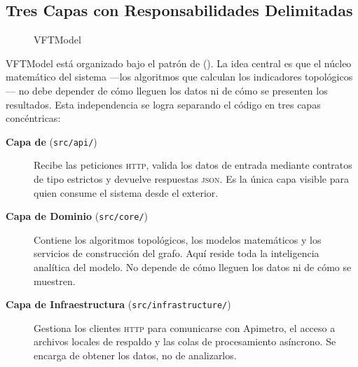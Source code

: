 \subsection{Tres Capas con Responsabilidades Delimitadas}
\label{subsec:vft-capas}

\begin{figure}[htbp]
    \centering
    \DIFdelbeginFL %
\DIFdelendFL \DIFaddbeginFL {}
    \caption[Arquitectura \textit{Ports and Adapters} de VFTModel]{ \DIFaddendFL VFTModel\DIFaddbeginFL {}\texttt{}\DIFaddendFL }
    \label{fig:VFTModel-arquitectura}
    \DIFdelbeginFL %
\DIFdelendFL \DIFaddbeginFL {}
\DIFaddendFL \end{figure}

VFTModel está organizado bajo el patrón de 
(). La idea central es que el núcleo matemático del
sistema —los algoritmos que calculan los indicadores topológicos— no debe depender
de cómo lleguen los datos ni de cómo se presenten los resultados. Esta
independencia se logra separando el código en tres capas concéntricas:

\begin{description}
    \item[\textbf{Capa de \api{}} (\texttt{src/api/})]
    Recibe las peticiones \textsc{http}, valida los datos de entrada mediante
    contratos de tipo estrictos y devuelve respuestas \textsc{json}. Es la única
    capa visible para quien consume el sistema desde el exterior.

    \item[\textbf{Capa de Dominio} (\texttt{src/core/})]
    Contiene los algoritmos topológicos, los modelos matemáticos y los servicios
    de construcción del grafo. Aquí reside toda la inteligencia analítica del
    modelo. No depende de cómo lleguen los datos ni de cómo se muestren.

    \item[\textbf{Capa de Infraestructura} (\texttt{src/infrastructure/})]
    Gestiona los clientes \textsc{http} para comunicarse con Apimetro, el acceso
    a archivos \geojson{} locales de respaldo y las colas de procesamiento
    asíncrono. Se encarga de obtener los datos, no de analizarlos.
\end{description}

